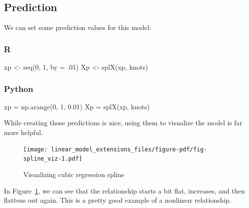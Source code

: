 \documentclass[
  letterpaper,
]{krantz}
\newenvironment{Shaded}{}{}
\newcommand{\AttributeTok}[1]{\textcolor[rgb]{0.49,0.56,0.16}{#1}}
\newcommand{\DecValTok}[1]{\textcolor[rgb]{0.25,0.63,0.44}{#1}}
\newcommand{\FloatTok}[1]{\textcolor[rgb]{0.25,0.63,0.44}{#1}}
\newcommand{\FunctionTok}[1]{\textcolor[rgb]{0.02,0.16,0.49}{#1}}
\newcommand{\NormalTok}[1]{#1}
\newcommand{\OperatorTok}[1]{\textcolor[rgb]{0.40,0.40,0.40}{#1}}
\newcommand{\OtherTok}[1]{\textcolor[rgb]{0.00,0.44,0.13}{#1}}
\begin{document}
\subsection{Prediction}\label{prediction-1}

We can set some prediction values for this model:

\subsubsection{R}

\begin{Shaded}
\begin{Highlighting}[]
\NormalTok{xp }\OtherTok{\textless{}{-}} \FunctionTok{seq}\NormalTok{(}\DecValTok{0}\NormalTok{, }\DecValTok{1}\NormalTok{, }\AttributeTok{by =}\NormalTok{ .}\DecValTok{01}\NormalTok{)}
\NormalTok{Xp }\OtherTok{\textless{}{-}} \FunctionTok{splX}\NormalTok{(xp, knots)  }
\end{Highlighting}
\end{Shaded}

\subsubsection{Python}

\begin{Shaded}
\begin{Highlighting}[]
\NormalTok{xp }\OperatorTok{=}\NormalTok{ np.arange(}\DecValTok{0}\NormalTok{, }\DecValTok{1}\NormalTok{, }\FloatTok{0.01}\NormalTok{)}
\NormalTok{Xp }\OperatorTok{=}\NormalTok{ splX(xp, knots)}
\end{Highlighting}
\end{Shaded}

While creating those predictions is nice, using them to visualize the
model is far more helpful.

\begin{figure}

{\centering \texttt{[image: linear\_model\_extensions\_files/figure-pdf/fig-spline\_viz-1.pdf]}

}

\caption{\label{fig-spline_viz}Visualizing cubic regression spline}

\end{figure}

In Figure~\ref{fig-spline_viz}, we can see that the relationship starts
a bit flat, increases, and then flattens out again. This is a pretty
good example of a nonlinear relationship.
\end{document}
